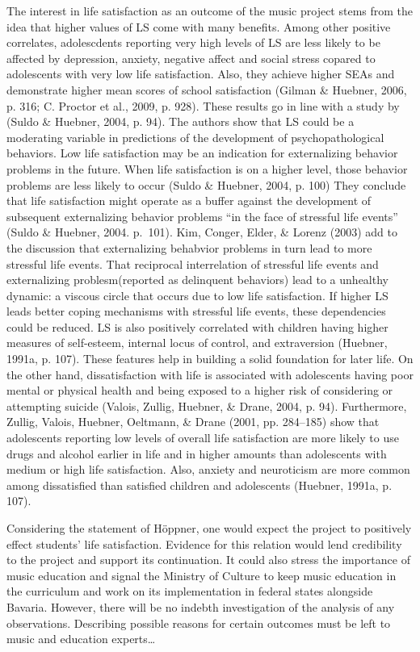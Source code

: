 \documentclass[a4, 12pt]{article}
\begin{document}
The interest in life satisfaction as an outcome of the music project stems from the idea that higher values of LS come with many benefits. Among other positive correlates, adolescdents reporting very high levels of LS are less likely to be affected by depression, anxiety, negative affect and social stress copared to adolescents with very low life satisfaction. Also, they achieve higher SEAs and demonstrate higher mean scores of school satisfaction (Gilman \& Huebner, 2006, p. 316; C. Proctor et al., 2009, p. 928). These results go in line with a study by (Suldo \& Huebner, 2004, p. 94). The authors show that LS could be a moderating variable in predictions of the development of psychopathological behaviors. Low life satisfaction may be an indication for externalizing behavior problems in the future. When life satisfaction is on a higher level, those behavior problems are less likely to occur (Suldo \& Huebner, 2004, p. 100) They conclude that life satisfaction might operate as a buffer against the development of subsequent externalizing behavior problems ``in the face of stressful life events'' (Suldo \& Huebner, 2004. p.~101). Kim, Conger, Elder, \& Lorenz (2003) add to the discussion that externalizing behabvior problems in turn lead to more stressful life events. That reciprocal interrelation of stressful life events and externalizing problesm(reported as delinquent behaviors) lead to a unhealthy dynamic: a viscous circle that occurs due to low life satisfaction. If higher LS leads better coping mechanisms with stressful life events, these dependencies could be reduced.
LS is also positively correlated with children having higher measures of self-esteem, internal locus of control, and extraversion (Huebner, 1991a, p. 107). These features help in building a solid foundation for later life. On the other hand, dissatisfaction with life is associated with adolescents having poor mental or physical health and being exposed to a higher risk of considering or attempting suicide (Valois, Zullig, Huebner, \& Drane, 2004, p. 94). Furthermore, Zullig, Valois, Huebner, Oeltmann, \& Drane (2001, pp. 284--185) show that adolescents reporting low levels of overall life satisfaction are more likely to use drugs and alcohol earlier in life and in higher amounts than adolescents with medium or high life satisfaction. Also, anxiety and neuroticism are more common among dissatisfied than satisfied children and adolescents (Huebner, 1991a, p. 107).

Considering the statement of Höppner, one would expect the project to positively effect students' life satisfaction. Evidence for this relation would lend credibility to the project and support its continuation. It could also stress the importance of music education and signal the Ministry of Culture to keep music education in the curriculum and work on its implementation in federal states alongside Bavaria. However, there will be no indebth investigation of the analysis of any observations. Describing possible reasons for certain outcomes must be left to music and education experts\ldots{}
\end{document}
